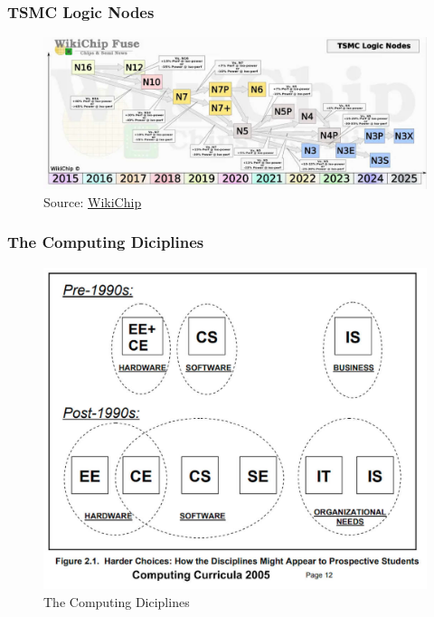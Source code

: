 \documentclass[aspectratio=169, xcolor=table, notheorems, hyperref={pdfpagelabels=false}]{beamer}
\begin{document}
\begin{frame}[fragile]
\frametitle{TSMC Logic Nodes}
\begin{figure}
\includegraphics[width=0.95\linewidth]{tsmc_logic_node}
\caption{Source: 
  \href{https://fuse.wikichip.org/wp-content/uploads/2020/04/wikichip_tsmc_logic_node_q1_2020.png}{WikiChip}}
\end{figure}
\end{frame}

\begin{frame}[fragile]
\frametitle{The Computing Diciplines}
\begin{figure}
\includegraphics[width=0.59\linewidth]{pic-cc2005}
\caption{The Computing Diciplines}
\end{figure}
\end{frame}

\end{document}
